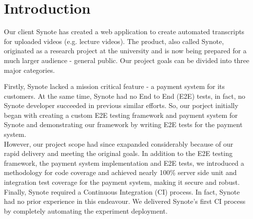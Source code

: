 \chapter{Introduction}
\label{chap:introduction}

Our client Synote has created a web application to create automated transcripts for uploaded videos (e.g. lecture videos). The product, also called Synote, originated as a research project at the university and is now being prepared for a much larger audience - general public. Our project goals can be divided into three major categories.

Firstly, Synote lacked a mission critical feature - a payment system for its customers. At the same time, Synote had no End to End (E2E) tests, in fact, no Synote developer succeeded in previous similar efforts. So, our porject initially began with creating a custom E2E testing framework and payment system for Synote and demonstrating our framework by writing E2E tests for the payment system.\\

However, our project scope had since exapanded considerably because of our rapid delivery and meeting the original goals. In addition to the E2E testing framework, the payment system implementation and E2E tests, we introduced a methodology for code coverage and achieved nearly 100\% server side unit and integration test coverage for the payment system, making it secure and robust.\\

Finally, Synote required a Continuous Integration (CI) process. In fact, Synote had no prior experience in this endeavour. We delivered Synote's first CI process by completely automating the experiment deployment.
